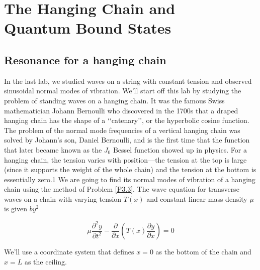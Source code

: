 
\chapter*{The Hanging Chain and \\ Quantum Bound States}
\section*{Resonance for a hanging chain}

In the last lab, we studied waves on a string with constant tension and observed
sinusoidal normal modes of vibration. We\rq ll start off this lab by studying the
problem of standing waves on a hanging chain. It was the famous Swiss mathematician Johann Bernoulli who discovered in the 1700s that a draped hanging
chain has the shape of a \lq\lq catenary\rq\rq, or the hyperbolic cosine function. The problem of the normal mode frequencies of a vertical hanging chain was solved by
Johann\rq s son, Daniel Bernoulli, and is the first time that the function that later
became known as the $J_0$ Bessel function showed up in physics.
For a hanging chain, the tension varies with position—the tension at the top
is large (since it supports the weight of the whole chain) and the tension at the
bottom is essentially zero.1 We are going to find its normal modes of vibration of a
hanging chain using the method of Problem \ref{P3.3}. The wave equation for transverse
waves on a chain with varying tension $T (x)$ and constant linear mass density $\mu$ is
given $by^2$

\begin{equation}\label{eq:41}
		\mu \frac{\partial^2 y}{\partial t^2} - \frac{\partial}{\partial x}(T(x)\frac{\partial y}{\partial x}) = 0
				\end{equation}
				
		We\rq ll use a coordinate system that defines $x = 0$ as the bottom of the chain and
$x = L$ as the ceiling.		


